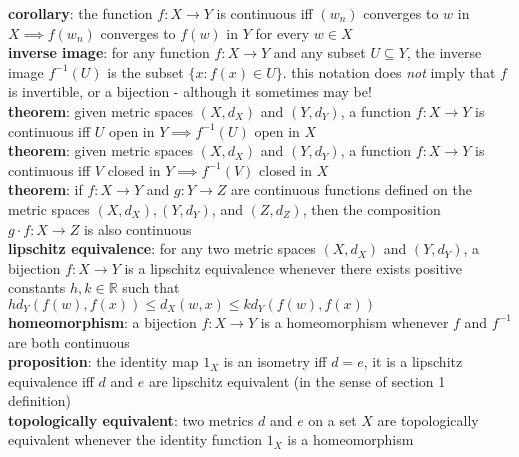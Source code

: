 \documentclass[a4paper]{article}
\begin{document}
\begin{multicols}{2}
\begin{framed}
	\end{framed}
	
	\begin{framed}
	\noindent
	\textbf{corollary}: the function $f: X \rightarrow Y$ is continuous iff $(w_n)$ converges to $w$ in $X \implies f(w_n)$ converges to $f(w)$ in $Y$ for every $w \in X$\\
	
		
	
	\noindent
	\textbf{inverse image}: for any function $f: X \rightarrow Y$ and any subset $U \subseteq Y$, the inverse image $f^{-1}(U)$ is the subset $\{ x : f(x) \in U \}$. this notation does \textit{not} imply that $f$ is invertible, or a bijection - although it sometimes may be!\\
	
	\noindent
	\textbf{theorem}: given metric spaces $(X, d_X)$ and $(Y, d_Y)$, a function $f: X \rightarrow Y$ is continuous iff $U$ open in $Y \implies f^{-1}(U)$ open in $X$\\
	
	\noindent
	\textbf{theorem}: given metric spaces $(X, d_X)$ and $(Y, d_Y)$, a function $f: X \rightarrow Y$ is continuous iff $V$ closed in $Y \implies f^{-1}(V)$ closed in $X$\\
	
	\noindent
	\textbf{theorem}: if $f: X \rightarrow Y$ and $g: Y \rightarrow Z$ are continuous functions defined on the metric spaces $(X, d_X), (Y, d_Y)$, and $(Z, d_Z)$, then the composition $g \cdot f: X \rightarrow Z$ is also continuous\\
	
	\noindent
	\textbf{lipschitz equivalence}: for any two metric spaces $(X, d_X)$ and $(Y, d_Y)$, a bijection $f: X \rightarrow Y$ is a lipschitz equivalence whenever there exists positive constants $h, k \in \mathbb{R}$ such that $hd_Y(f(w), f(x)) \leq d_X(w, x) \leq kd_Y(f(w), f(x))$\\
	
	\noindent
	\textbf{homeomorphism}: a bijection $f: X \rightarrow Y$ is a homeomorphism whenever $f$ and $f^{-1}$ are both continuous\\

	\noindent
	\textbf{proposition}: the identity map $1_X$ is an isometry iff $d = e$, it is a lipschitz equivalence iff $d$ and $e$ are lipschitz equivalent (in the sense of section 1 definition)\\
	
	\noindent
	\textbf{topologically equivalent}: two metrics $d$ and $e$ on a set $X$ are topologically equivalent whenever the identity function $1_X$ is a homeomorphism\\
	

\end{framed}
\end{multicols}
\end{document}
